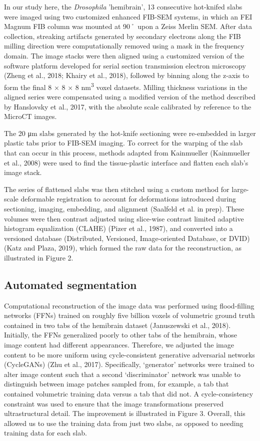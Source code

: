 \documentclass{article}
\begin{document}
In our study here, the \emph{Drosophila} ’hemibrain’, 13 consecutive hot-knifed slabs were imaged using two customized enhanced FIB-SEM systems, in which an FEI Magnum FIB column was mounted at 90˚ upon a Zeiss Merlin SEM. After data collection, streaking artifacts generated by secondary electrons along the FIB milling direction were computationally removed using a mask in the frequency domain. The image stacks were then aligned using a customized version of the software platform developed for serial section transmission electron microscopy (Zheng et al., 2018; Khairy et al., 2018), followed by binning along the z-axis to form the final 8 × 8 × 8 nm\textsuperscript{3} voxel datasets. Milling thickness variations in the aligned series were compensated using a modified version of the method described by Hanslovsky et al., 2017, with the absolute scale calibrated by reference to the MicroCT images.

The 20 μm slabs generated by the hot-knife sectioning were re-embedded in larger plastic tabs prior to FIB-SEM imaging. To correct for the warping of the slab that can occur in this process, methods adapted from Kainmueller (Kainmueller et al., 2008) were used to find the tissue-plastic interface and flatten each slab’s image stack.

The series of flattened slabs was then stitched using a custom method for large-scale deformable registration to account for deformations introduced during sectioning, imaging, embedding, and alignment (Saalfeld et al. in prep). These volumes were then contrast adjusted using slice-wise contrast limited adaptive histogram equalization (CLAHE) (Pizer et al., 1987), and converted into a versioned database (Distributed, Versioned, Image-oriented Database, or DVID) (Katz and Plaza, 2019), which formed the raw data for the reconstruction, as illustrated in Figure 2.

\subsection*{Automated segmentation}

Computational reconstruction of the image data was performed using flood-filling networks (FFNs) trained on roughly five billion voxels of volumetric ground truth contained in two tabs of the hemibrain dataset (Januszewski et al., 2018). Initially, the FFNs generalized poorly to other tabs of the hemibrain, whose image content had different appearances. Therefore, we adjusted the image content to be more uniform using cycle-consistent generative adversarial networks (CycleGANs) (Zhu et al., 2017). Specifically, ‘generator’ networks were trained to alter image content such that a second ‘discriminator’ network was unable to distinguish between image patches sampled from, for example, a tab that contained volumetric training data versus a tab that did not. A cycle-consistency constraint was used to ensure that the image transformations preserved ultrastructural detail. The improvement is illustrated in Figure 3. Overall, this allowed us to use the training data from just two slabs, as opposed to needing training data for each slab.
\end{document}
